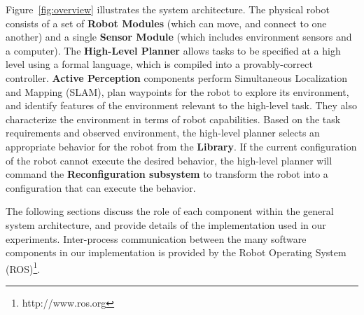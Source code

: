 \documentclass[journal]{IEEEtran}
\newcommand{\separator}{ \noindent \rule{\columnwidth}{1pt} }
\newenvironment{old}{\color{Maroon} \separator \textbf{[\textit{Old:}]} }{\ignorespacesafterend \separator}
\begin{document}
Figure~\ref{fig:overview} illustrates the system architecture.
The physical robot consists of a set of \textbf{Robot Modules} (which can move, and connect to one another) and a single \textbf{Sensor Module} (which includes environment sensors and a computer).
The \textbf{High-Level Planner} allows tasks to be specified at a high level using a formal language, which is compiled into a provably-correct controller.
\textbf{Active Perception} components perform Simultaneous Localization and Mapping (SLAM), plan waypoints for the robot to explore its environment, and identify features of the environment relevant to the high-level task. They also characterize the environment in terms of robot capabilities.
Based on the task requirements and observed environment, the high-level planner selects an appropriate behavior for the robot from the \textbf{Library}.
If the current configuration of the robot cannot execute the desired behavior, the high-level planner will command the \textbf{Reconfiguration subsystem} to transform the robot into a configuration that can execute the behavior.

The following sections discuss the role of each component within the general system architecture, and provide details of the implementation used in our experiments. Inter-process communication between the many software components in our implementation is provided by the Robot Operating System (ROS)\footnote{http://www.ros.org}.  
%

\end{document}
